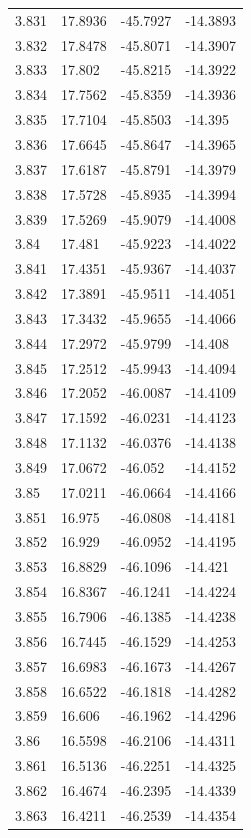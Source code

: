 \begin{tabular}{llll}
3.831 & 17.8936 & -45.7927 & -14.3893 \\
3.832 & 17.8478 & -45.8071 & -14.3907 \\
3.833 & 17.802 & -45.8215 & -14.3922 \\
3.834 & 17.7562 & -45.8359 & -14.3936 \\
3.835 & 17.7104 & -45.8503 & -14.395 \\
3.836 & 17.6645 & -45.8647 & -14.3965 \\
3.837 & 17.6187 & -45.8791 & -14.3979 \\
3.838 & 17.5728 & -45.8935 & -14.3994 \\
3.839 & 17.5269 & -45.9079 & -14.4008 \\
3.84 & 17.481 & -45.9223 & -14.4022 \\
3.841 & 17.4351 & -45.9367 & -14.4037 \\
3.842 & 17.3891 & -45.9511 & -14.4051 \\
3.843 & 17.3432 & -45.9655 & -14.4066 \\
3.844 & 17.2972 & -45.9799 & -14.408 \\
3.845 & 17.2512 & -45.9943 & -14.4094 \\
3.846 & 17.2052 & -46.0087 & -14.4109 \\
3.847 & 17.1592 & -46.0231 & -14.4123 \\
3.848 & 17.1132 & -46.0376 & -14.4138 \\
3.849 & 17.0672 & -46.052 & -14.4152 \\
3.85 & 17.0211 & -46.0664 & -14.4166 \\
3.851 & 16.975 & -46.0808 & -14.4181 \\
3.852 & 16.929 & -46.0952 & -14.4195 \\
3.853 & 16.8829 & -46.1096 & -14.421 \\
3.854 & 16.8367 & -46.1241 & -14.4224 \\
3.855 & 16.7906 & -46.1385 & -14.4238 \\
3.856 & 16.7445 & -46.1529 & -14.4253 \\
3.857 & 16.6983 & -46.1673 & -14.4267 \\
3.858 & 16.6522 & -46.1818 & -14.4282 \\
3.859 & 16.606 & -46.1962 & -14.4296 \\
3.86 & 16.5598 & -46.2106 & -14.4311 \\
3.861 & 16.5136 & -46.2251 & -14.4325 \\
3.862 & 16.4674 & -46.2395 & -14.4339 \\
3.863 & 16.4211 & -46.2539 & -14.4354 \\

\end{tabular}
